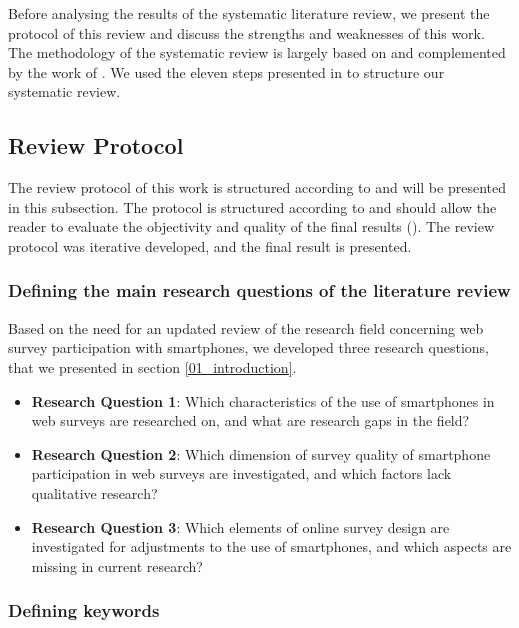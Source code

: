 Before analysing the results of the systematic literature review, we present the protocol of this review and discuss the strengths and weaknesses of this work. The methodology of the systematic review is largely based on \cite{weidt_systematic_2016} and complemented by the work of \cite{xiao_guidance_2017,petticrew_systematic_2008,snyder_literature_2019,denyer_producing_2009}. We used the eleven steps presented in \cite{weidt_systematic_2016} to structure our systematic review.

\subsection{Review Protocol}

The review protocol of this work is structured according to \cite{weidt_systematic_2016} and will be presented in this subsection. The protocol is structured according to \cite{weidt_systematic_2016} and should allow the reader to evaluate the objectivity and quality of the final results (\cite{page_prisma_2021}). The review protocol was iterative developed, and the final result is presented.


\subsubsection{Defining the main research questions of the literature review}

Based on the need for an updated review of the research field concerning web survey participation with smartphones, we developed three research questions, that we presented in section \ref{01_introduction}.

\begin{itemize}
   \item \textbf{Research Question 1}: Which characteristics of the use of smartphones in web surveys are researched on, and what are research gaps in the field? 
   \item \textbf{Research Question 2}: Which dimension of survey quality of smartphone participation in web surveys are investigated, and which factors lack qualitative research?
   \item \textbf{Research Question 3}: Which elements of online survey design are investigated for adjustments to the use of smartphones, and which aspects are missing in current research?
\end{itemize}

\subsubsection{Defining keywords}
\label{subsubsec: Defining search string}

